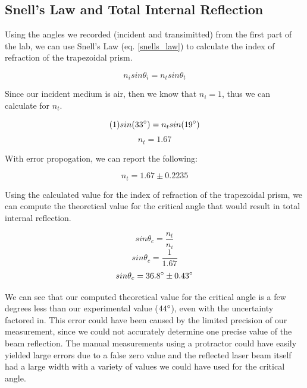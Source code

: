 \documentclass{article}
\begin{document}
\subsection{Snell's Law and Total Internal Reflection}

Using the angles we recorded (incident and transimitted) from the first part of
the lab, we can use Snell's Law (eq. \ref{snells_law}) to calculate the index of
refraction of the trapezoidal prism.

\begin{equation}
    \label{snells_law}
    n_{i}sin\theta_{i} = n_{t}sin\theta_{t}
\end{equation}

Since our incident medium is air, then we know that $n_{i}=1$, thus we can
calculate for $n_{t}$.

\begin{equation}
    \label{snells_law_1}
    (1)sin(33\degree) = n_{t}sin(19\degree)
\end{equation}
\begin{equation}
    \label{snells_law_2}
    n_{t} = 1.67
\end{equation}

With error propogation, we can report the following:

\begin{equation}
    \label{snells_law_3}
    n_{t} = 1.67 \pm 0.2235
\end{equation}

Using the calculated value for the index of refraction of the trapezoidal prism,
we can compute the theoretical value for the critical angle that would result in
total internal reflection.

\begin{equation}
    \label{total_internal_reflection_1}
    sin\theta_{c} = \frac{n_{t}}{n_{i}}
\end{equation}
\begin{equation}
    \label{total_internal_reflection_2}
    sin\theta_{c} = \frac{1}{1.67}
\end{equation}
\begin{equation}
    \label{total_internal_reflection_3}
    sin\theta_{c} = 36.8\degree \pm 0.43\degree
\end{equation}

We can see that our computed theoretical value for the critical angle is a few
degrees less than our experimental value ($44\degree$), even with the
uncertainty factored in. This error could have been caused by the limited
precision of our measurement, since we could not accurately determine one
precise value of the beam reflection. The manual measurements using a
protractor could have easily yielded large errors due to a false zero value and
the reflected laser beam itself had a large width with a variety of values we
could have used for the critical angle.
\end{document}
